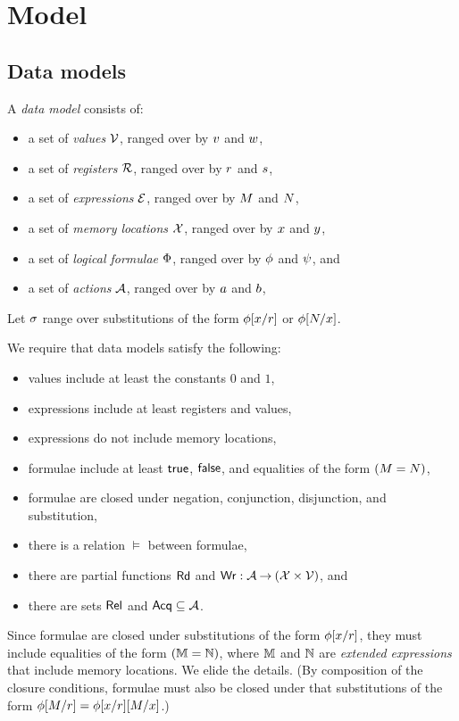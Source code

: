 \section{Model}
\label{sec:model}
\subsection{Data models}
\label{sec:preliminaries}

A \emph{data model} consists of:
\begin{itemize}
\item a set of \emph{values} $\mathcal{V}$, ranged over by
  $v$ and $w$,
\item a set of \emph{registers} $\mathcal{R}$, ranged over by
  $r$ and $s$,
\item a set of \emph{expressions} $\mathcal{E}$, ranged over by
  $M$ and $N$,
\item a set of \emph{memory locations} $\mathcal{X}$, ranged over by
  $x$ and $y$,
\item a set of \emph{logical formulae} $\Phi$, ranged over by
  $\phi$ and $\psi$, and
\item a set of \emph{actions} $\mathcal{A}$, ranged over by $a$ and $b$,
\end{itemize}
Let $\sigma$ range over substitutions of the form $\phi[x/r]$ or $\phi[N/x]$.

We require that data models satisfy the following:
\begin{itemize}
\item values include at least the constants $0$ and $1$,
\item expressions include at least registers and values,
\item expressions do not include memory locations,
\item formulae include at least $\mathsf{true}$, $\mathsf{false}$, and equalities of the form $(M=N)$,
\item formulae are closed under negation, conjunction, disjunction, and
  substitution, 
\item there is a relation $\vDash$ between formulae, 
\item there are partial functions $\mathsf{Rd}$ and $\mathsf{Wr}: \mathcal{A} \mathbin\rightarrow (\mathcal{X}
  \times \mathcal{V})$, and
\item there are sets $\mathsf{Rel}$ and $\mathsf{Acq} \subseteq\mathcal{A}$.
\end{itemize}
Since formulae are closed under substitutions of the form
$\phi[x/r]$, they must include equalities of the form
$(\mathbb{M}=\mathbb{N})$, where $\mathbb{M}$ and $\mathbb{N}$ are \emph{extended
  expressions} that include memory locations.  We elide the details.
(By composition of the closure conditions, formulae must also be closed
under that substitutions of the form $\phi[M/r]=\phi[x/r][M/x]$.)

